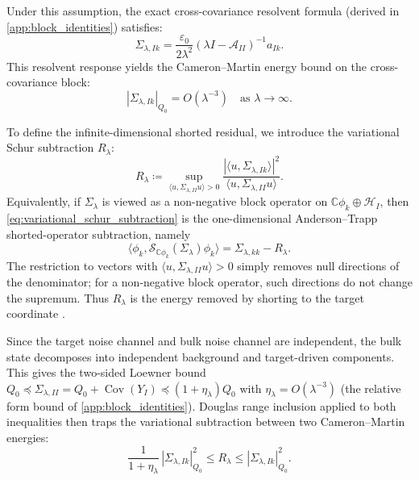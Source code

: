 \documentclass[preprint,12pt]{elsarticle}
\theoremstyle{plain}
\theoremstyle{definition}
\theoremstyle{remark}
\begin{document}
    Under this assumption, the exact cross-covariance resolvent formula (derived in \ref{app:block_identities}) satisfies:
    \begin{equation}
        \Sigma_{\lambda,Ik} = \frac{\varepsilon_0}{2\lambda^2} (\lambda I - \mathcal{A}_{II})^{-1} a_{Ik}.
    \end{equation}
    This resolvent response yields the Cameron--Martin energy bound on the cross-covariance block:
    \begin{equation}
        \label{eq:cross_norm_bound}
        |\Sigma_{\lambda,Ik}|_{Q_0} = O(\lambda^{-3}) \quad \text{as } \lambda \to \infty.
    \end{equation}

    To define the infinite-dimensional shorted residual, we introduce the variational Schur subtraction $R_\lambda$:
    \begin{equation}
        \label{eq:variational_schur_subtraction}
        R_\lambda \coloneqq \sup_{\langle u, \Sigma_{\lambda,II} u \rangle > 0} \frac{|\langle u, \Sigma_{\lambda,Ik} \rangle|^2}{\langle u, \Sigma_{\lambda,II} u \rangle}.
    \end{equation}
    Equivalently, if $\Sigma_\lambda$ is viewed as a non-negative block operator on $\mathbb{C}\phi_k\oplus\mathcal{H}_I$, then \eqref{eq:variational_schur_subtraction} is the one-dimensional Anderson--Trapp shorted-operator subtraction, namely
    \begin{equation}
        \label{eq:shorted_operator_scalar}
        \big\langle \phi_k,\mathcal{S}_{\mathbb{C}\phi_k}(\Sigma_\lambda)\phi_k\big\rangle
        =\Sigma_{\lambda,kk}-R_\lambda.
    \end{equation}
    The restriction to vectors with $\langle u,\Sigma_{\lambda,II}u\rangle>0$ simply removes null directions of the denominator; for a non-negative block operator, such directions do not change the supremum. Thus $R_\lambda$ is the energy removed by shorting to the target coordinate \cite{anderson1975shorted,owhadi2015conditioning,contino2021matrix,naikjohnson2024complementable}.

    Since the target noise channel and bulk noise channel are independent, the bulk state decomposes into independent background and target-driven components. This gives the two-sided Loewner bound $Q_0 \preceq \Sigma_{\lambda,II} = Q_0 + \operatorname{Cov}(Y_I) \preceq (1+\eta_\lambda)Q_0$ with $\eta_\lambda = O(\lambda^{-3})$ (the relative form bound of \ref{app:block_identities}). Douglas range inclusion applied to both inequalities then traps the variational subtraction between two Cameron--Martin energies:
    \begin{equation}
        \label{eq:variational_subtraction_two_sided}
        \frac{1}{1+\eta_\lambda}\,|\Sigma_{\lambda,Ik}|_{Q_0}^2 \le R_\lambda \le |\Sigma_{\lambda,Ik}|_{Q_0}^2 .
    \end{equation}
\end{document}
